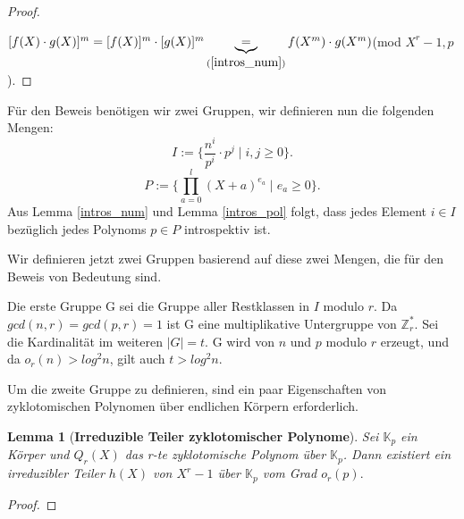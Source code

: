 \documentclass[12pt,oneside]{article}
\newtheorem{lemma}[theorem]{Lemma}
\theoremstyle{remark}
\theoremstyle{definition}
\begin{document}
\begin{proof}\label{intros_pol}
    \centerline{$[f(X) \cdot g(X)]^{m} = [f(X)]^m \cdot [g(X)]^m \underbrace{=}_{(\ref{intros_num})} f(X^m) \cdot g(X^m)$(mod $X^r - 1, p$).}
\end{proof}

Für den Beweis benötigen wir zwei Gruppen, wir definieren nun die folgenden Mengen:\newline\newline
\begin{equation}\label{I_Set}
      I := \{ \frac{n^i}{p^i} \cdot p^j \mid i,j \geq 0\}.
\end{equation}
\begin{equation}
     P := \{ \prod_{a = 0}^{l} (X + a)^{e_{a}} \mid e_{a} \geq 0 \}.
\end{equation}\label{P_Set}
\newline\newline
Aus Lemma \ref{intros_num} und Lemma \ref{intros_pol} folgt, dass jedes Element $i \in I$ bezüglich jedes Polynoms $p \in P$ introspektiv ist.\newline\newline

Wir definieren jetzt zwei Gruppen basierend auf diese zwei Mengen, die für den Beweis von Bedeutung sind.\newline\newline

Die erste Gruppe G sei die Gruppe aller Restklassen in $I$ modulo $r$. Da $gcd(n,r) = gcd(p,r) = 1 $ ist G eine multiplikative Untergruppe von $\mathbb{Z}_{r}^{*}$. Sei die Kardinalität im weiteren $ | G | = t $. G wird von $n$ und $p$ modulo $r$ erzeugt, und da $o_{r}(n) > log^2 n$, gilt auch $t > log^2 n$.\newline\newline

Um die zweite Gruppe zu definieren, sind ein paar Eigenschaften von zyklotomischen Polynomen über endlichen Körpern erforderlich.

\begin{lemma}[\textbf{Irreduzible Teiler zyklotomischer Polynome}] Sei $\mathbb{K}_{p}$ ein Körper und $Q_{r}(X)$ das r-te zyklotomische Polynom über $\mathbb{K}_{p}$. Dann existiert ein irreduzibler Teiler $h(X)$ von $X^r - 1$ über $\mathbb{K}_{p}$ vom Grad $o_{r}(p).$
\end{lemma}

\begin{proof}
    
\end{proof}
\end{document}
